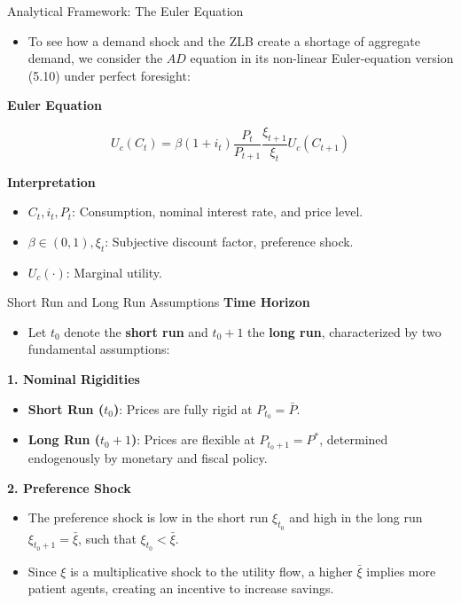 \documentclass[11pt,aspectratio=169]{beamer}
\begin{document}
\begin{frame}{Analytical Framework: The Euler Equation}
\small

\begin{itemize}
    \item To see how a demand shock and the ZLB create a shortage of aggregate demand, we consider the $AD$ equation in its non-linear Euler-equation version (5.10) under perfect foresight:
\end{itemize}
\vspace{0.3cm}
\textbf{Euler Equation}

\begin{equation}
U_{c}(C_{t})=\beta (1+i_{t}) \frac{P_{t}}{P_{t+1}} \frac{\xi_{t+1}}{\xi_{t}} U_{c}(C_{t+1})
\label{EulerLiquidity}
\end{equation}

\textbf{Interpretation}
\begin{itemize}
    \item $C_t, i_t, P_t$: Consumption, nominal interest rate, and price level.
    \item $\beta \in (0,1), \xi_t$: Subjective discount factor, preference shock.
    \item $U_c(\cdot)$: Marginal utility.
\end{itemize}

\end{frame}
\begin{frame}{Short Run and Long Run Assumptions}
\small
\textbf{Time Horizon}
\begin{itemize}
    \item Let $t_0$ denote the \textbf{short run} and $t_0+1$ the \textbf{long run}, characterized by two fundamental assumptions:
\end{itemize}

\vspace{0.2cm}
\textbf{1. Nominal Rigidities}
\begin{itemize}
    \item \textbf{Short Run ($t_0$)}: Prices are fully rigid at $P_{t_0} = \bar{P}$.
    \item \textbf{Long Run ($t_0+1$)}: Prices are flexible at $P_{t_0+1} = P^*$, determined endogenously by monetary and fiscal policy.
\end{itemize}

\vspace{0.2cm}
\textbf{2. Preference Shock}
\begin{itemize}
    \item The preference shock is low in the short run $\xi_{t_0}$ and high in the long run $\xi_{t_0+1} = \bar{\xi}$, such that $\xi_{t_0} < \bar{\xi}$.
    \item Since $\xi$ is a multiplicative shock to the utility flow, a higher $\bar{\xi}$ implies more patient agents, creating an incentive to increase savings.
\end{itemize}
\end{frame}
\end{document}
